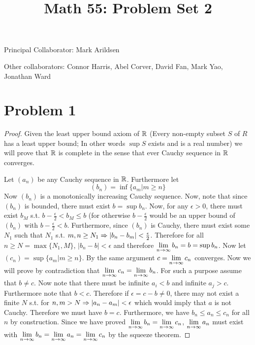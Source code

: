 \title{Math 55: Problem Set 2}

\maketitle
Principal Collaborator: Mark Arildsen \par
Other collaborators: Connor Harris, Abel Corver, David Fan, Mark Yao, Jonathan Ward
\section*{Problem 1}
\begin{proof}
Given the least upper bound axiom of $\mathbb{R}$ (Every non-empty subset $S$ of $R$ has a least upper bound; In other words $\sup S$ exists and is a real number) we will prove that $\mathbb{R}$ is complete in the sense that ever Cauchy sequence in $\mathbb{R}$ converges.\par
Let $(a_n)$ be any Cauchy sequence in $\mathbb{R}$. Furthermore let 
\[ (b_n) = \inf\{a_m|m\geq n\} \]
Now $(b_n)$ is a monotonically increasing Cauchy sequence. Now, note that since $(b_n)$ is bounded, there must exist $b=\sup b_n$. Now, for any $\epsilon>0$, there must exist $b_M$ s.t. $b - \frac{\epsilon}{2} < b_M \leq b$  (for otherwise $b-\frac{\epsilon}{2}$ would be an upper bound of $(b_n)$ with $b-\frac{\epsilon}{2}<b$. Furthermore, since $(b_n)$ is Cauchy, there must exist some $N_1$ such that $N_1$ s.t. $m,n\geq N_1 \Rightarrow |b_n-b_m|<\frac{\epsilon}{2}$. Therefore for all $n\geq N=\max \{N_1,M\}$, $|b_n-b|<\epsilon$ and therefore $\lim\limits_{n\to\infty} b_n = b = \sup b_n$.
Now let $ (c_n) = \sup\{ a_m| m \geq n\}$. By the same argument $c=\lim\limits_{n\to\infty} c_n$ converges. 
Now we will prove by contradiction that $\lim\limits_{n\to\infty} c_n = \lim\limits_{n\to\infty} b_n$. For such a purpose assume that $b\neq c$. Now note that there must be infinite $a_i<b$ and infinite $a_j>c$. Furthermore note that $b<c$. Therefore if $\epsilon = c-b \neq 0$, there may not exist a finite $N$ s.t. for $n,m > N \Rightarrow |a_n-a_m|<\epsilon$ which would imply that $a$ is not Cauchy. Therefore we must have $b=c$. Furthermore, we have $b_n\leq a_n \leq c_n$ for all $n$ by construction. Since we have proved $\lim\limits_{n\to\infty} b_n = \lim\limits_{n\to\infty} c_n$, $\lim\limits_{n\to\infty} a_n$ must exist with $\lim\limits_{n\to\infty} b_n = \lim\limits_{n\to\infty} a_n = \lim\limits_{n\to\infty} c_n$ by the squeeze theorem.
\end{proof} 
